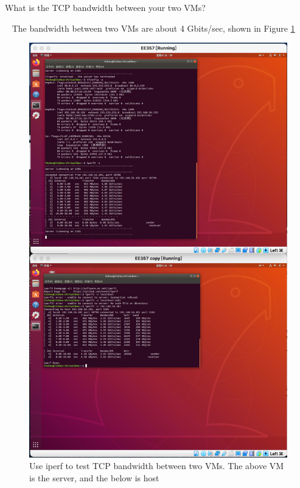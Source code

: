 \begin{exercise}[]{What is the TCP bandwidth between your two VMs?}
  \begin{solution}
  \par{~}
  The bandwidth between two VMs are about 4 Gbits/sec, shown in Figure \ref{fig:ex4}
  \begin{figure}[hb]
    \begin{center}
    \includegraphics[width=12cm]{img/lab1/ex4}
    \caption{Use iperf to test TCP bandwidth between two VMs. The above VM is the server, and the below is host}
    \label{fig:ex4}
    \end{center}
  \end{figure}
  \end{solution}
  \label{ex4}
\end{exercise}


